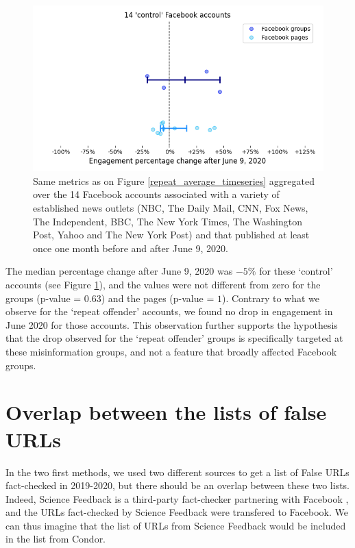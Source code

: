 \documentclass[review]{elsarticle}
\begin{document}
{\begin{figure}[!h]
\centering
\includegraphics[scale=0.5]{./../figure/supplementary_mainstream_june_drop_percentage_change.png}
\caption{
Same metrics as on Figure \ref{repeat_average_timeseries} aggregated over the 14 Facebook accounts associated with a variety of established news outlets (NBC, The Daily Mail, CNN, Fox News, The Independent, BBC, The New York Times, The Washington Post, Yahoo and The New York Post) and that published at least once one month before and after June 9, 2020.
}
\label{june_drop_control}
\end{figure}

The median percentage change after June 9, 2020 was $-5\%$ for these `control' accounts (see Figure \ref{june_drop_control}), and the values were not different from zero for the groups (p-value = $0.63$) and the pages (p-value = $1$).
Contrary to what we observe for the `repeat offender' accounts, we found no drop in engagement in June 2020 for those accounts.
This observation further supports the hypothesis that the drop observed for the `repeat offender' groups is specifically targeted at these misinformation groups, and not a feature that broadly affected Facebook groups.

\section*{Overlap between the lists of false URLs}

In the two first methods, we used two different sources to get a list of False URLs fact-checked in 2019-2020, but there should be an overlap between these two lists. 
Indeed, Science Feedback is a third-party fact-checker partnering with Facebook \citep{sciencefeedbackFbPartner}, and the URLs fact-checked by Science Feedback were transfered to Facebook.
We can thus imagine that the list of URLs from Science Feedback would be included in the list from Condor.

}
\end{document}
